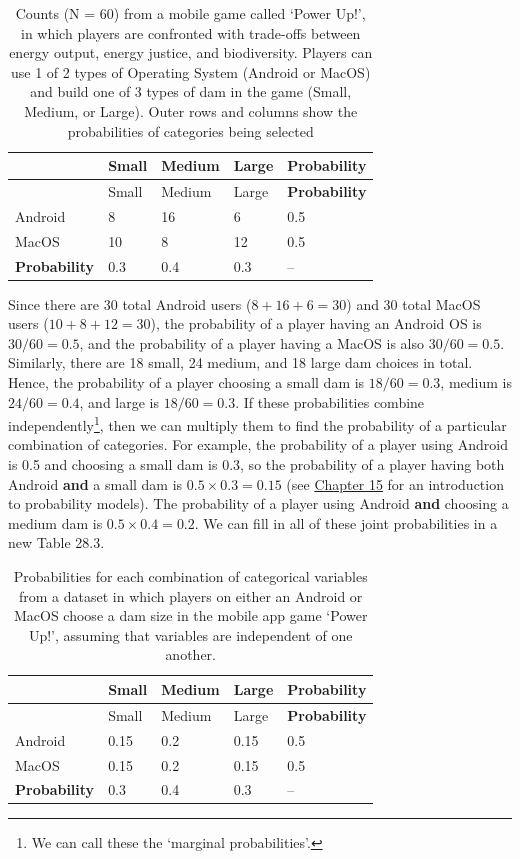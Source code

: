 \documentclass[
]{scrbook}
\begin{document}
\begin{longtable}[]{@{}lllll@{}}
\caption{\label{tab:unnamed-chunk-139}Counts (N = 60) from a mobile game called `Power Up!', in which players are confronted with trade-offs between energy output, energy justice, and biodiversity. Players can use 1 of 2 types of Operating System (Android or MacOS) and build one of 3 types of dam in the game (Small, Medium, or Large). Outer rows and columns show the probabilities of categories being selected}\tabularnewline
\toprule
& Small & Medium & Large & \textbf{Probability} \\
\midrule
\endfirsthead
\toprule
& Small & Medium & Large & \textbf{Probability} \\
\midrule
\endhead
Android & 8 & 16 & 6 & 0.5 \\
MacOS & 10 & 8 & 12 & 0.5 \\
\textbf{Probability} & 0.3 & 0.4 & 0.3 & -- \\
\bottomrule
\end{longtable}

Since there are 30 total Android users (\(8 + 16 + 6 = 30\)) and 30 total MacOS users (\(10 + 8 + 12 = 30\)), the probability of a player having an Android OS is \(30/60 = 0.5\), and the probability of a player having a MacOS is also \(30 / 60 = 0.5\).
Similarly, there are 18 small, 24 medium, and 18 large dam choices in total.
Hence, the probability of a player choosing a small dam is \(18/60 = 0.3\), medium is \(24/60 = 0.4\), and large is \(18/60 = 0.3\).
If these probabilities combine independently\footnote{We can call these the `marginal probabilities'.}, then we can multiply them to find the probability of a particular combination of categories.
For example, the probability of a player using Android is 0.5 and choosing a small dam is 0.3, so the probability of a player having both Android \textbf{and} a small dam is \(0.5 \times 0.3 = 0.15\) (see \protect\hyperlink{Chapter_15}{Chapter 15} for an introduction to probability models).
The probability of a player using Android \textbf{and} choosing a medium dam is \(0.5 \times 0.4 = 0.2\).
We can fill in all of these joint probabilities in a new Table 28.3.

\begin{longtable}[]{@{}lllll@{}}
\caption{\label{tab:unnamed-chunk-140}Probabilities for each combination of categorical variables from a dataset in which players on either an Android or MacOS choose a dam size in the mobile app game `Power Up!', assuming that variables are independent of one another.}\tabularnewline
\toprule
& Small & Medium & Large & \textbf{Probability} \\
\midrule
\endfirsthead
\toprule
& Small & Medium & Large & \textbf{Probability} \\
\midrule
\endhead
Android & 0.15 & 0.2 & 0.15 & 0.5 \\
MacOS & 0.15 & 0.2 & 0.15 & 0.5 \\
\textbf{Probability} & 0.3 & 0.4 & 0.3 & -- \\
\bottomrule
\end{longtable}
\end{document}
